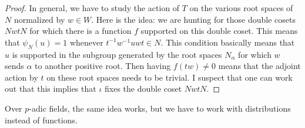 \documentclass[../notes.tex]{subfiles}
\begin{document}
\begin{proof}
	In general, we have to study the action of $T$ on the various root spaces of $N$ normalized by $w\in W$. Here is the idea: we are hunting for those double cosets $NwtN$ for which there is a function $f$ supported on this double coset. This means that $\psi_N(u)=1$ whenever $t^{-1}w^{-1}uwt\in N$. This condition basically means that $u$ is supported in the subgroup generated by the root spaces $N_\alpha$ for which $w$ sends $\alpha$ to another positive root. Then having $f(tw)\ne0$ means that the adjoint action by $t$ on these root spaces needs to be trivial. I suspect that one can work out that this implies that $\iota$ fixes the double coset $NwtN$.
\end{proof}
\begin{remark}
	Over $p$-adic fields, the same idea works, but we have to work with distributions instead of functions.
\end{remark}
\end{document}
